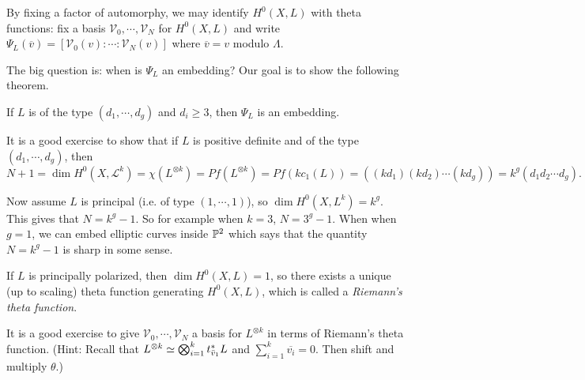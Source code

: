 By fixing a factor of automorphy, we may identify $H^0(X,L)$ with theta functions: fix a basis $\mathcal{V}_0,\cdots,\mathcal{V}_N$ for $H^0(X,L)$ and write $\Psi_L(\overline{v})=[\mathcal{V}_0(v):\cdots:\mathcal{V}_N(v)]$ where $\overline{v}=v$ modulo $\Lambda$. 

The big question is: when is $\Psi_L$ an embedding? Our goal is to show the following theorem.
\begin{theorem}[Lefschetz]
If $L$ is of the type $(d_1,\cdots,d_g)$ and $d_i\geq 3$, then $\Psi_L$ is an embedding.
\end{theorem}

\begin{example}
It is a good exercise to show that if $L$ is positive definite and of the type $(d_1,\cdots,d_g)$, then 
$$N+1=\dim H^0(X,\mathcal{L}^k)=\chi(L^{\otimes k})=Pf(L^{\otimes k})=Pf(k c_1(L))=((kd_1)(kd_2)\cdots (kd_g))=k^g(d_1d_2\cdots d_g).$$

Now assume $L$ is principal (i.e. of type $(1,\cdots,1)$), so $\dim H^0(X,L^k)=k^g$. This gives that $N=k^g-1$. So for example when $k=3$, $N=3^g-1$. When when $g=1$, we can embed elliptic curves inside ${\mathbb P}^2$ which says that the quantity $N=k^g-1$ is sharp in some sense. 
\end{example}

If $L$ is principally polarized, then $\dim H^0(X,L)=1$, so there exists a unique (up to scaling) theta function generating $H^0(X,L)$, which is called a \emph{Riemann's theta function}. 

It is a good exercise to give $\mathcal{V}_0,\cdots,\mathcal{V}_N$ a basis for $L^{\otimes k}$ in terms of Riemann's theta function. (Hint: Recall that $L^{\otimes k}\simeq \bigotimes_{i=1}^k t_{\bar{v}_1}^* L$ and $\sum_{i=1}^k \overline{v_i}=0$. Then shift and multiply $\theta$.)